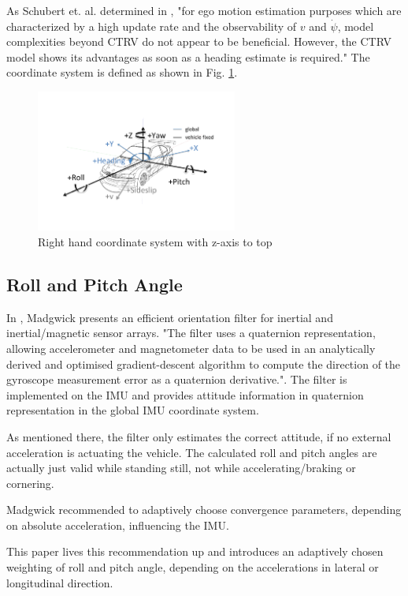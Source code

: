 \documentclass[conference]{IEEEtran}
\begin{document}
As Schubert et. al. determined in \cite{Schubert2011}, "for ego motion estimation purposes which are characterized by a high update rate and the observability of $v$ and $\dot \psi$, model complexities beyond CTRV do not appear to be beneficial. However, the CTRV model shows its advantages as soon as a heading estimate is required."
The coordinate system is defined as shown in Fig.  \ref{KOS}.

\begin{figure}[ht]
\centering
\includegraphics[width=2.6in]{images/Koordinatensystem-DIN70000.pdf}
\caption{Right hand coordinate system with z-axis to top}
\label{KOS}
\end{figure}

\subsection{Roll and Pitch Angle}

In \cite{Madgwick2010}, Madgwick presents an efficient orientation filter for inertial and inertial/magnetic sensor arrays. "The filter uses a quaternion representation, allowing accelerometer and magnetometer data to be used in an analytically derived and optimised gradient-descent algorithm to compute the direction of the gyroscope measurement error as a quaternion derivative.". The filter is implemented on the IMU and provides attitude information in quaternion representation in the global IMU coordinate system.

As mentioned there, the filter only estimates the correct attitude, if no external acceleration is actuating the vehicle. The calculated roll and pitch angles are actually just valid while standing still, not while accelerating/braking or cornering.

Madgwick recommended to adaptively choose convergence parameters, depending on absolute acceleration, influencing the IMU.

This paper lives this recommendation up and introduces an adaptively chosen weighting of roll and pitch angle, depending on the accelerations in lateral or longitudinal direction.
\end{document}
